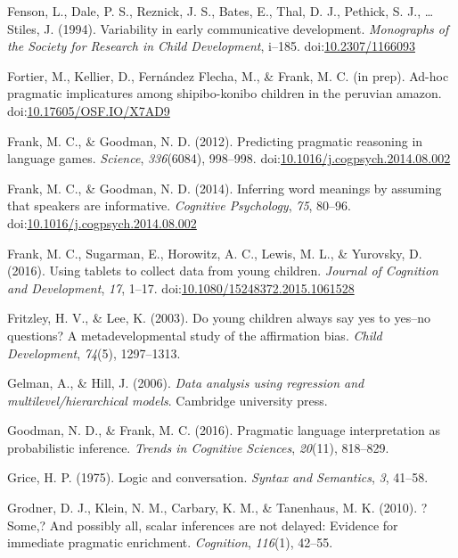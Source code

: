 \documentclass[man]{apa6}
\begin{document}
\hypertarget{ref-fenson1994}{}
Fenson, L., Dale, P. S., Reznick, J. S., Bates, E., Thal, D. J.,
Pethick, S. J., \ldots{} Stiles, J. (1994). Variability in early
communicative development. \emph{Monographs of the Society for Research
in Child Development}, i--185.
doi:\href{https://doi.org/10.2307/1166093}{10.2307/1166093}

\hypertarget{ref-fortierunderrev}{}
Fortier, M., Kellier, D., Fernández Flecha, M., \& Frank, M. C. (in
prep). Ad-hoc pragmatic implicatures among shipibo-konibo children in
the peruvian amazon.
doi:\href{https://doi.org/10.17605/OSF.IO/X7AD9}{10.17605/OSF.IO/X7AD9}

\hypertarget{ref-frank2012}{}
Frank, M. C., \& Goodman, N. D. (2012). Predicting pragmatic reasoning
in language games. \emph{Science}, \emph{336}(6084), 998--998.
doi:\href{https://doi.org/10.1016/j.cogpsych.2014.08.002}{10.1016/j.cogpsych.2014.08.002}

\hypertarget{ref-frank2014}{}
Frank, M. C., \& Goodman, N. D. (2014). Inferring word meanings by
assuming that speakers are informative. \emph{Cognitive Psychology},
\emph{75}, 80--96.
doi:\href{https://doi.org/10.1016/j.cogpsych.2014.08.002}{10.1016/j.cogpsych.2014.08.002}

\hypertarget{ref-frank2016}{}
Frank, M. C., Sugarman, E., Horowitz, A. C., Lewis, M. L., \& Yurovsky,
D. (2016). Using tablets to collect data from young children.
\emph{Journal of Cognition and Development}, \emph{17}, 1--17.
doi:\href{https://doi.org/10.1080/15248372.2015.1061528}{10.1080/15248372.2015.1061528}

\hypertarget{ref-fritzley2003young}{}
Fritzley, H. V., \& Lee, K. (2003). Do young children always say yes to
yes--no questions? A metadevelopmental study of the affirmation bias.
\emph{Child Development}, \emph{74}(5), 1297--1313.

\hypertarget{ref-gelman2006data}{}
Gelman, A., \& Hill, J. (2006). \emph{Data analysis using regression and
multilevel/hierarchical models}. Cambridge university press.

\hypertarget{ref-goodman2016}{}
Goodman, N. D., \& Frank, M. C. (2016). Pragmatic language
interpretation as probabilistic inference. \emph{Trends in Cognitive
Sciences}, \emph{20}(11), 818--829.

\hypertarget{ref-grice1975logic}{}
Grice, H. P. (1975). Logic and conversation. \emph{Syntax and
Semantics}, \emph{3}, 41--58.

\hypertarget{ref-grodner2010}{}
Grodner, D. J., Klein, N. M., Carbary, K. M., \& Tanenhaus, M. K.
(2010). ?Some,? And possibly all, scalar inferences are not delayed:
Evidence for immediate pragmatic enrichment. \emph{Cognition},
\emph{116}(1), 42--55.
\end{document}
